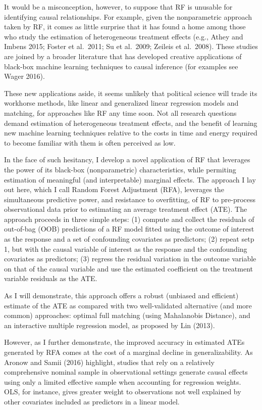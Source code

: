 \documentclass[11pt,]{article}
\begin{document}
It would be a misconception, however, to suppose that RF is unusable for
identifying causal relationships. For example, given the nonparametric
approach taken by RF, it comes as little surprise that it has found a
home among those who study the estimation of heterogeneous treatment
effects (e.g., Athey and Imbens 2015; Foster et al.~2011; Su et
al.~2009; Zeileis et al.~2008). These studies are joined by a broader
literature that has developed creative applications of black-box machine
learning techniques to causal inference (for examples see Wager 2016).

These new applications aside, it seems unlikely that political science
will trade its workhorse methods, like linear and generalized linear
regression models and matching, for approaches like RF any time soon.
Not all research questions demand estimation of heterogeneous treatment
effects, and the benefit of learning new machine learning techniques
relative to the costs in time and energy required to become familiar
with them is often perceived as low.

In the face of such hesitancy, I develop a novel application of RF that
leverages the power of its black-box (nonparametric) characteristics,
while permiting estimation of meaningful (and interpretable) marginal
effects. The approach I lay out here, which I call Random Forest
Adjustment (RFA), leverages the simultaneous predictive power, and
resistance to overfitting, of RF to pre-process observational data prior
to estimating an average treatment effect (ATE). The approach proceeds
in three simple steps: (1) compute and collect the residuals of
out-of-bag (OOB) predictions of a RF model fitted using the outcome of
interest as the response and a set of confounding covariates as
predictors; (2) repeat setp 1, but with the causal variable of interest
as the response and the confounding covariates as predictors; (3)
regress the residual variation in the outcome variable on that of the
causal variable and use the estimated coefficient on the treatment
variable residuals as the ATE.

As I will demonstrate, this approach offers a robust (unbiased and
efficient) estimate of the ATE as compared with two well-validated
alternative (and more common) approaches: optimal full matching (using
Mahalanobis Distance), and an interactive multiple regression model, as
proposed by Lin (2013).

However, as I further demonstrate, the improved accuracy in estimated
ATEs generated by RFA comes at the cost of a marginal decline in
generalizability. As Aronow and Samii (2016) highlight, studies that
rely on a relatively comprehensive nominal sample in observational
settings generate causal effects using only a limited effective sample
when accounting for regression weights. OLS, for instance, gives greater
weight to observations not well explained by other covariates included
as predictors in a linear model.
\end{document}
